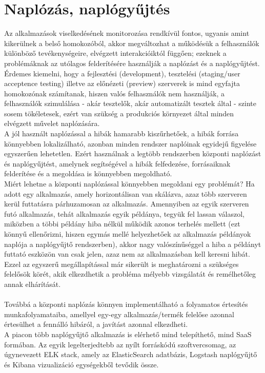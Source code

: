 \section{Naplózás, naplógyűjtés}
\label{sect:logging}
Az alkalmazások viselkedésének monitorozása rendkívül fontos, ugyanis amint kikerülnek a belső homokozóból, akkor megváltozhat a működésük a felhasználók különböző tevékenységeire, elvégzett interakcióiktól függően; ezeknek a problémáknak az utólagos felderítésére használják a naplózást és a naplógyűjtést. Érdemes kiemelni, hogy a fejlesztési (development), tesztelési (staging/user acceptence testing) illetve az előnézeti (preview) szerverek is mind egyfajta homokozónak számítanak, hiszen valós felhasználók nem használják, a felhasználók szimulálása - akár tesztelők, akár automatizált tesztek által - szinte sosem tökéletesek, ezért van szükség a produkciós környezet által minden elvégzett művelet naplózására.
\\
A jól használt naplózással a hibák hamarabb kiszűrhetőek, a hibák forrása könnyebben lokalizálható, azonban minden rendszer naplóinak egyidejű figyelése egyszerűen lehetetlen. Ezért használnak a legtöbb rendszerben központi naplózást és naplógyűjtést, amelynek segítségével a hibák felfedezése, forrásaiknak felderítése és a megoldása is könnyebben megoldható.\\
Miért lehetne a központi naplózással könnyebben megoldani egy problémát? Ha adott egy alkalmazás, amely horizontálisan van skálázva, azaz több szerveren kerül futtatásra párhuzamosan az alkalmazás. Amennyiben az egyik szerveren futó alkalmazás, tehát alkalmazás egyik példánya, tegyük fel lassan válaszol, miközben a többi példány hiba nélkül működik azonos terhelés mellett (ezt könnyű ellenőrizni, hiszen egymás mellé helyezhetőek az alkalmazás példányok naplója a naplógyűjtő rendszerben), akkor nagy valószínűséggel a hiba a példányt futtató eszközön van csak jelen, azaz nem az alkalmazásban kell keresni hibát. Ezzel az egyszerű megállapítással már sikerült is meghatározni a szükséges felelősök körét, akik elkezdhetik a probléma mélyebb vizsgálatát és remélhetőleg annak elhárítását.\\
\hfill\\
Továbbá a központi naplózás könnyen implementálható a folyamatos értesítés munkafolyamataiba, amellyel egy-egy alkalmazás/termék felelőse azonnal értesülhet a fennálló hibáról, a javítást azonnal elkezdheti.
\hfill\\
A piacon több naplógyűjtő alkalmazás is elérhető mind telepíthető, mind SaaS formában. Az egyik legelterjedtebb az nyílt forráskódú szoftvercsomag, az úgynevezett ELK stack, amely az ElasticSearch adatbázis, Logstash naplógyűjtő és Kibana vizualizáció egységekből tevődik össze.
\\

